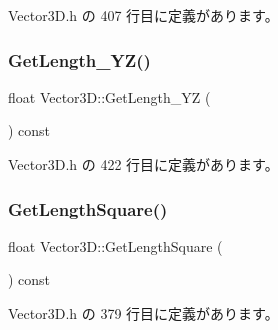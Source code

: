  Vector3\+D.\+h の 407 行目に定義があります。

\mbox{\label{class_vector3_d_a183854c5c7ea8bf32f752a02cf3fc3ce}} 
\subsubsection{\texorpdfstring{Get\+Length\+\_\+\+Y\+Z()}{GetLength\_YZ()}}
{\footnotesize\ttfamily float Vector3\+D\+::\+Get\+Length\+\_\+\+YZ (\begin{DoxyParamCaption}{ }\end{DoxyParamCaption}) const\hspace{0.3cm}{\ttfamily [inline]}}



 Vector3\+D.\+h の 422 行目に定義があります。

\mbox{\label{class_vector3_d_a0d486a19d3f7515e2f147c78bb73ce07}} 
\subsubsection{\texorpdfstring{Get\+Length\+Square()}{GetLengthSquare()}}
{\footnotesize\ttfamily float Vector3\+D\+::\+Get\+Length\+Square (\begin{DoxyParamCaption}{ }\end{DoxyParamCaption}) const\hspace{0.3cm}{\ttfamily [inline]}}



 Vector3\+D.\+h の 379 行目に定義があります。

